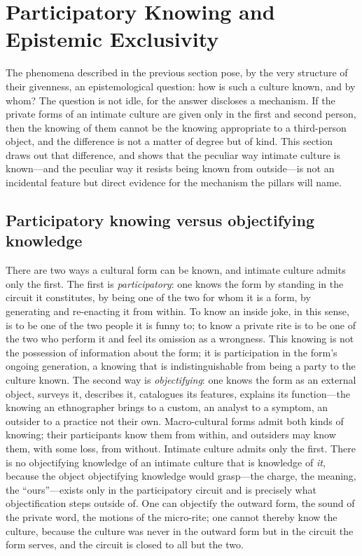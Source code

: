 \section{Participatory Knowing and Epistemic Exclusivity}
\label{p24:sec:participation}

\noindent
The phenomena described in the previous section pose, by the very structure of their givenness, an epistemological question: how is such a culture known, and by whom? The question is not idle, for the answer discloses a mechanism. If the private forms of an intimate culture are given only in the first and second person, then the knowing of them cannot be the knowing appropriate to a third-person object, and the difference is not a matter of degree but of kind. This section draws out that difference, and shows that the peculiar way intimate culture is known---and the peculiar way it resists being known from outside---is not an incidental feature but direct evidence for the mechanism the pillars will name.

\subsection*{Participatory knowing versus objectifying knowledge}

There are two ways a cultural form can be known, and intimate culture admits only the first. The first is \emph{participatory}: one knows the form by standing in the circuit it constitutes, by being one of the two for whom it is a form, by generating and re-enacting it from within. To know an inside joke, in this sense, is to be one of the two people it is funny to; to know a private rite is to be one of the two who perform it and feel its omission as a wrongness. This knowing is not the possession of information about the form; it is participation in the form's ongoing generation, a knowing that is indistinguishable from being a party to the culture known. The second way is \emph{objectifying}: one knows the form as an external object, surveys it, describes it, catalogues its features, explains its function---the knowing an ethnographer brings to a custom, an analyst to a symptom, an outsider to a practice not their own. Macro-cultural forms admit both kinds of knowing; their participants know them from within, and outsiders may know them, with some loss, from without. Intimate culture admits only the first. There is no objectifying knowledge of an intimate culture that is knowledge of \emph{it}, because the object objectifying knowledge would grasp---the charge, the meaning, the ``ours''---exists only in the participatory circuit and is precisely what objectification steps outside of. One can objectify the outward form, the sound of the private word, the motions of the micro-rite; one cannot thereby know the culture, because the culture was never in the outward form but in the circuit the form serves, and the circuit is closed to all but the two.

